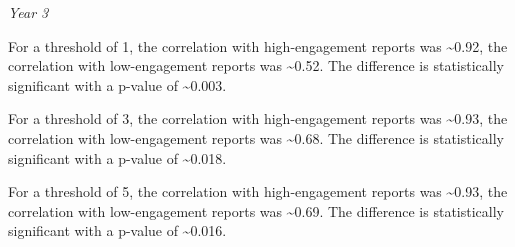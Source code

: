 \documentclass[
]{article}
\newenvironment{Shaded}{\begin{snugshade}}{\end{snugshade}}
\newcommand{\AttributeTok}[1]{\textcolor[rgb]{0.77,0.63,0.00}{#1}}
\newcommand{\FunctionTok}[1]{\textcolor[rgb]{0.00,0.00,0.00}{#1}}
\newcommand{\NormalTok}[1]{#1}
\newcommand{\OtherTok}[1]{\textcolor[rgb]{0.56,0.35,0.01}{#1}}
\newcommand{\SpecialCharTok}[1]{\textcolor[rgb]{0.00,0.00,0.00}{#1}}
\newcommand{\StringTok}[1]{\textcolor[rgb]{0.31,0.60,0.02}{#1}}
\begin{document}
\begin{Shaded}
\end{Shaded}

\emph{Year 3}

For a threshold of 1, the correlation with high-engagement reports was
\textasciitilde0.92, the correlation with low-engagement reports was
\textasciitilde0.52. The difference is statistically significant with a
p-value of \textasciitilde0.003.

For a threshold of 3, the correlation with high-engagement reports was
\textasciitilde0.93, the correlation with low-engagement reports was
\textasciitilde0.68. The difference is statistically significant with a
p-value of \textasciitilde0.018.

For a threshold of 5, the correlation with high-engagement reports was
\textasciitilde0.93, the correlation with low-engagement reports was
\textasciitilde0.69. The difference is statistically significant with a
p-value of \textasciitilde0.016.
\end{document}
